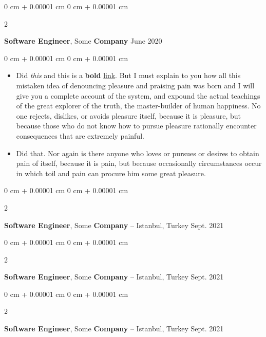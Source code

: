 \documentclass[10pt, letterpaper]{article}
\newenvironment{highlights}{
    \begin{itemize}[
        topsep=0.10 cm,
        parsep=0.10 cm,
        partopsep=0pt,
        itemsep=0pt,
        leftmargin=0 cm + 10pt
    ]
}{
    \end{itemize}
} %
\newenvironment{onecolentry}{
    \begin{adjustwidth}{
        0 cm + 0.00001 cm
    }{
        0 cm + 0.00001 cm
    }
}{
    \end{adjustwidth}
} %
\newenvironment{twocolentry}[2][]{
    \onecolentry
    \def\secondColumn{#2}
    \setcolumnwidth{\fill, 4.5 cm}
    \begin{paracol}{2}
}{
    \switchcolumn \raggedleft \secondColumn
    \end{paracol}
    \endonecolentry
} %
\begin{document}
        \vspace{0.2 cm}

        \begin{twocolentry}{
            June 2020
        }
            \textbf{Software Engineer}, Some \textbf{Company}\end{twocolentry}

        \vspace{0.10 cm}
        \begin{onecolentry}
            \begin{highlights}
                \item Did \textit{this} and this is a \textbf{bold} \href{https://example.com}{link}. But I must explain to you how all this mistaken idea of denouncing pleasure and praising pain was born and I will give you a complete account of the system, and expound the actual teachings of the great explorer of the truth, the master-builder of human happiness. No one rejects, dislikes, or avoids pleasure itself, because it is pleasure, but because those who do not know how to pursue pleasure rationally encounter consequences that are extremely painful.
                \item Did that. Nor again is there anyone who loves or pursues or desires to obtain pain of itself, because it is pain, but because occasionally circumstances occur in which toil and pain can procure him some great pleasure.
            \end{highlights}
        \end{onecolentry}


        \vspace{0.2 cm}

        \begin{twocolentry}{
            Sept. 2021
        }
            \textbf{Software Engineer}, Some \textbf{Company} -- Istanbul, Turkey\end{twocolentry}



        \vspace{0.2 cm}

        \begin{twocolentry}{
            Sept. 2021
        }
            \textbf{Software Engineer}, Some \textbf{Company} -- Istanbul, Turkey\end{twocolentry}



        \vspace{0.2 cm}

        \begin{twocolentry}{
            Sept. 2021
        }
            \textbf{Software Engineer}, Some \textbf{Company} -- Istanbul, Turkey\end{twocolentry}
\end{document}
